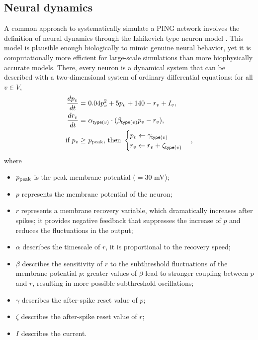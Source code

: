 \subsection{Neural dynamics}
\label{sec:neural-dynamics}

A common approach to systematically simulate a PING network involves the definition of neural dynamics through the Izhikevich type neuron model  \cite{Izhikevich2003}. This model is plausible enough biologically to mimic genuine neural behavior, yet it is computationally more efficient for large-scale simulations than more biophysically accurate models. There, every neuron is a dynamical system that can be described with a two-dimensional system of ordinary differential equations: for all $v \in V$,
\begin{align}
    \frac{dp_v}{dt} =\ & 0.04 p_v^2 + 5p_v + 140 - r_v + I_v,
    \label{eq:Izhikevich-model-dp-dt} \\
    \frac{dr_v}{dt} =\ & \alpha_{\mathsf{type}(v)} \cdot (\beta_{\mathsf{type}(v)} p_v - r_v), \label{eq:Izhikevich-model-dr-dt} \\
    \text{if } p_v \geq\ & p_{\mathrm{peak}} \text{, then } 
    \begin{cases}
        p_v \leftarrow \gamma_{\mathsf{type}(v)} \\
        r_v \leftarrow r_v + \zeta_{\mathsf{type}(v)}
    \end{cases}, 
    \label{eq:Izhikevich-model-p30}
\end{align}
where
\begin{itemize}
    \item $p_{\mathrm{peak}}$ is the peak membrane potential ($= 30$ mV);
    
    \item $p$ represents the membrane potential of the neuron; 
    
    \item $r$ represents a membrane recovery variable, which dramatically increases after spikes; it provides negative feedback that suppresses the increase of $p$ and reduces the fluctuations in the output;
    
    \item $\alpha$ describes the timescale of $r$, it is proportional to the recovery speed;
    
    \item $\beta$ describes the sensitivity of $r$ to the subthreshold fluctuations of the membrane potential $p$: greater values of $\beta$ lead to stronger coupling between $p$ and $r$, resulting in more possible subthreshold oscillations;
    
    \item $\gamma$ describes the after-spike reset value of $p$;
    
    \item $\zeta$ describes the after-spike reset value of $r$;
    
    \item $I$ describes the current.
\end{itemize}

